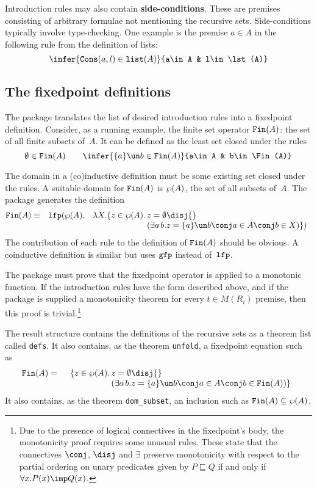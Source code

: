 Introduction rules may also contain {\bf side-conditions}.  These are
premises consisting of arbitrary formulae not mentioning the recursive
sets. Side-conditions typically involve type-checking.  One example is the
premise $a\in A$ in the following rule from the definition of lists:
\[ \infer{\Cons(a,l)\in\lst(A)}{a\in A & l\in\lst(A)} \]

\subsection{The fixedpoint definitions}
The package translates the list of desired introduction rules into a fixedpoint
definition.  Consider, as a running example, the finite set operator
${\tt Fin}(A)$: the set of all finite subsets of~$A$.  It can be
defined as the least set closed under the rules
\[  \emptyset\in\Fin(A)  \qquad 
    \infer{\{a\}\un b\in\Fin(A)}{a\in A & b\in\Fin(A)} 
\]

The domain in a (co)inductive definition must be some existing set closed
under the rules.  A suitable domain for ${\tt Fin}(A)$ is $\wp(A)$, the set of all
subsets of~$A$.  The package generates the definition
\begin{eqnarray*}
  \Fin(A) & \equiv &  \lfp(\pow(A), \;
  \begin{array}[t]{r@{\,}l}
      \lambda X. \{z\in\pow(A). & z=\emptyset \disj{} \\
                  &(\exists a\,b. z=\{a\}\un b\conj a\in A\conj b\in X)\})
  \end{array}
\end{eqnarray*} 
The contribution of each rule to the definition of ${\tt Fin}(A)$ should be
obvious.  A coinductive definition is similar but uses ${\tt gfp}$ instead
of~${\tt lfp}$.

The package must prove that the fixedpoint operator is applied to a
monotonic function.  If the introduction rules have the form described
above, and if the package is supplied a monotonicity theorem for every
$t\in M(R_i)$ premise, then this proof is trivial.\footnote{Due to the
  presence of logical connectives in the fixedpoint's body, the
  monotonicity proof requires some unusual rules.  These state that the
  connectives $\conj$, $\disj$ and $\exists$ preserve monotonicity with respect
  to the partial ordering on unary predicates given by $P\sqsubseteq Q$ if and
  only if $\forall x.P(x)\imp Q(x)$.}

The result structure contains the definitions of the recursive sets as a theorem
list called {\tt defs}.  It also contains, as the theorem {\tt unfold}, a
fixedpoint equation such as 
\begin{eqnarray*}
  \Fin(A) & = &
  \begin{array}[t]{r@{\,}l}
     \{z\in\pow(A). & z=\emptyset \disj{} \\
             &(\exists a\,b. z=\{a\}\un b\conj a\in A\conj b\in \Fin(A))\}
  \end{array}
\end{eqnarray*}
It also contains, as the theorem {\tt dom\_subset}, an inclusion such as 
${\tt Fin}(A)\subseteq\wp(A)$.


